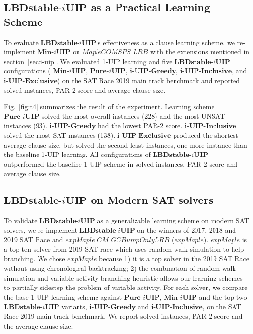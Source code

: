\documentclass[runningheads]{llncs}
\newcommand{\IUIP}{\textbf{LBDstable-$i$UIP}}
\newcommand{\IUIPPURE}{\textbf{Pure-$i$UIP}}
\newcommand{\IUIPMIN}{\textbf{Min-$i$UIP}}
\newcommand{\IUIPGreedy}{\textbf{i-UIP-Greedy}}
\newcommand{\IUIPActive}{\textbf{i-UIP-Inclusive}}
\newcommand{\IUIPDist}{\textbf{i-UIP-Exclusive}}
\newcommand{\MapleBase}{\textit{MapleCOMSPS\_LRB}}
\newcommand{\expSAT}{\textit{expMaple\_CM\_GCBumpOnlyLRB} }
\newcommand{\expSATShort}{\textit{expMaple} }
\begin{document}
\subsection{$\IUIP$ as a Practical Learning Scheme}
To evaluate $\IUIP$'s effectiveness as a clause learning scheme, we
re-implement $\IUIPMIN$ on $\MapleBase$ with the extensions mentioned
in section~\ref{sec:i-uip}. We evaluated 1-UIP learning and five
$\IUIP$ configurations ( $\IUIPMIN$, $\IUIPPURE$, $\IUIPGreedy$,
$\IUIPActive$, and $\IUIPDist$) on the SAT Race 2019 main track
benchmark and reported solved instances, PAR-2 score and average
clause size.

Fig.~\ref{fig:t4} summarizes the result of the experiment. Learning
scheme $\IUIPPURE$ solved the most overall instances (228) and the
most UNSAT instances (93). $\IUIPGreedy$ had the lowest PAR-2
score. $\IUIPActive$ solved the most SAT instances (138). $\IUIPDist$
produced the shortest average clause size, but solved the second least
instances, one more instance than the baseline 1-UIP learning. All
configurations of $\IUIP$ outperformed the baseline 1-UIP scheme in
solved instances, PAR-2 score and average clause size.


\subsection{$\IUIP$ on Modern SAT solvers}
To validate $\IUIP$ as a generalizable learning scheme on modern SAT
solvers, we re-implement $\IUIP$ on the winners of 2017, 2018 and 2019
SAT Race\cite{} and $\expSAT$\cite{} ($\expSATShort$). $\expSATShort$
is a top ten solver from 2019 SAT race which uses random walk
simulation to help branching. We chose $\expSATShort$ because 1) it is
a top solver in the 2019 SAT Race without using chronological
backtracking; 2) the combination of random walk simulation and
variable activity branching heuristic allows our learning schemes to
partially sidestep the problem of variable activity. For each solver,
we compare the base 1-UIP learning scheme against $\IUIPPURE$,
$\IUIPMIN$ and the top two $\IUIP$ variants, $\IUIPGreedy$ and
$\IUIPActive$, on the SAT Race 2019 main track benchmark. We report
solved instances, PAR-2 score and the average clause size.
\end{document}
